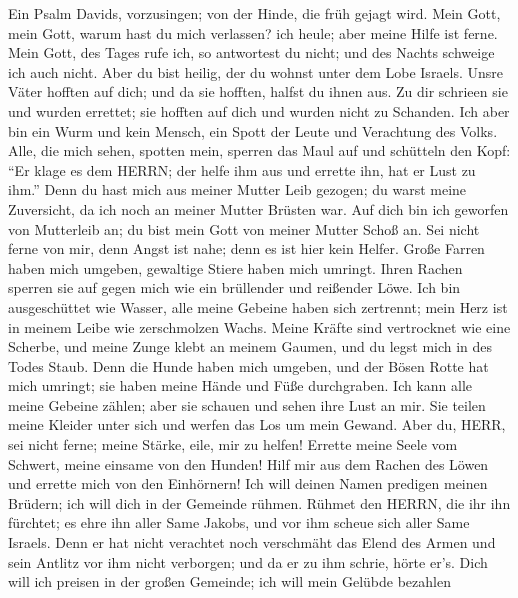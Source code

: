  Ein Psalm Davids, vorzusingen; von der Hinde, die früh
gejagt wird. Mein Gott, mein Gott, warum hast du mich verlassen? ich
heule; aber meine Hilfe ist ferne.  Mein Gott, des Tages
rufe ich, so antwortest du nicht; und des Nachts schweige ich auch
nicht.  Aber du bist heilig, der du wohnst unter dem Lobe
Israels.  Unsre Väter hofften auf dich; und da sie hofften,
halfst du ihnen aus.  Zu dir schrieen sie und wurden
errettet; sie hofften auf dich und wurden nicht zu Schanden.
 Ich aber bin ein Wurm und kein Mensch, ein Spott der Leute
und Verachtung des Volks.  Alle, die mich sehen, spotten
mein, sperren das Maul auf und schütteln den Kopf:  ``Er
klage es dem HERRN; der helfe ihm aus und errette ihn, hat er Lust zu
ihm.''  Denn du hast mich aus meiner Mutter Leib gezogen; du
warst meine Zuversicht, da ich noch an meiner Mutter Brüsten war.
 Auf dich bin ich geworfen von Mutterleib an; du bist mein
Gott von meiner Mutter Schoß an.  Sei nicht ferne von mir,
denn Angst ist nahe; denn es ist hier kein Helfer.  Große
Farren haben mich umgeben, gewaltige Stiere haben mich umringt.
 Ihren Rachen sperren sie auf gegen mich wie ein brüllender
und reißender Löwe.  Ich bin ausgeschüttet wie Wasser, alle
meine Gebeine haben sich zertrennt; mein Herz ist in meinem Leibe wie
zerschmolzen Wachs.  Meine Kräfte sind vertrocknet wie eine
Scherbe, und meine Zunge klebt an meinem Gaumen, und du legst mich in
des Todes Staub.  Denn die Hunde haben mich umgeben, und
der Bösen Rotte hat mich umringt; sie haben meine Hände und Füße
durchgraben.  Ich kann alle meine Gebeine zählen; aber sie
schauen und sehen ihre Lust an mir.  Sie teilen meine
Kleider unter sich und werfen das Los um mein Gewand.  Aber
du, HERR, sei nicht ferne; meine Stärke, eile, mir zu helfen!
 Errette meine Seele vom Schwert, meine einsame von den
Hunden!  Hilf mir aus dem Rachen des Löwen und errette mich
von den Einhörnern!  Ich will deinen Namen predigen meinen
Brüdern; ich will dich in der Gemeinde rühmen.  Rühmet den
HERRN, die ihr ihn fürchtet; es ehre ihn aller Same Jakobs, und vor ihm
scheue sich aller Same Israels.  Denn er hat nicht
verachtet noch verschmäht das Elend des Armen und sein Antlitz vor ihm
nicht verborgen; und da er zu ihm schrie, hörte er's.  Dich
will ich preisen in der großen Gemeinde; ich will mein Gelübde bezahlen
